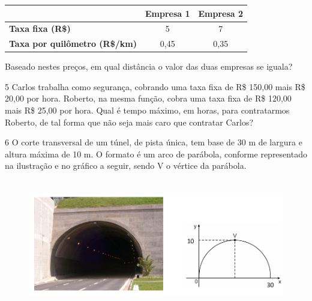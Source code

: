 \begin{escolha}
\begin{escolha}
\begin{tabular}{|l |c|c|}
\hline
 & \textbf{Empresa 1} & \textbf{Empresa 2} \\ \hline
\textbf{Taxa fixa (R\$)} & 5 & 7 \\ \hline
\textbf{Taxa por quilômetro (R\$/km)} & 0,45 & 0,35 \\ \hline
\end{tabular}

Baseado nestes preços, em qual distância o valor das duas 
empresas se iguala?

\begin{boxmedio}
\end{boxmedio}

\num{5} Carlos trabalha como segurança, cobrando uma taxa fixa de R\$ 150,00 mais
R\$ 20,00 por hora. Roberto, na mesma função, cobra uma taxa fixa de R\$ 120,00
mais R\$ 25,00 por hora. Qual é tempo máximo, em horas, para contratarmos Roberto,
de tal forma que não seja mais caro que contratar Carlos?

\begin{boxpeq}

\end{boxpeq}

\num{6} O corte transversal de um túnel, de pista única, tem base de 30 m de largura
e altura máxima de 10 m. O formato é um arco de parábola, conforme representado na
ilustração e no gráfico a seguir, sendo V o vértice da parábola.

\begin{figure}
\centering
\includegraphics[width=5.56667in,height=2.24198in]{./_SAEB_9_MAT/media/image143.png}
\end{figure}


\end{escolha}
\end{escolha}
